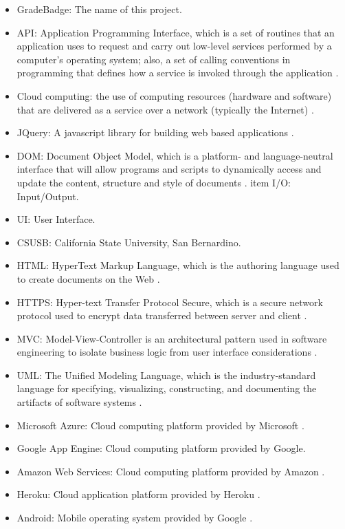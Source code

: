 \begin{itemize}
\item GradeBadge: The name of this project.
\item API: Application Programming Interface, which is a set of routines that an application uses to request and carry out low-level services performed by a computer's operating system; also, a set of calling conventions in programming that defines how a service is invoked through the application \cite{API}.
\item Cloud computing: the use of computing resources (hardware and software) that are delivered as a service over a network (typically the Internet) \cite{cloudcomputing}.
\item JQuery: A javascript library for building web based applications \cite{JQuery}.
\item DOM: Document Object Model, which is a platform- and language-neutral interface that will allow programs and scripts to dynamically access and update the content, structure and style of documents \cite{DOM}.
item I/O: Input/Output.
\item UI: User Interface.
\item CSUSB: California State University, San Bernardino.
\item HTML: HyperText Markup Language, which is the authoring language used to create documents on the Web \cite{w3}.
\item HTTPS: Hyper-text Transfer Protocol Secure, which is a secure network protocol used to encrypt data transferred  between server and client \cite{https}.
\item MVC\label{def:mvc}: Model-View-Controller is an architectural pattern used in software engineering to isolate business logic from user interface considerations \cite{MVC}.
\item UML: The Unified Modeling Language, which is the industry-standard language for specifying, visualizing, constructing, and documenting the artifacts of software systems \cite{uml}.
\item Microsoft Azure: Cloud computing platform provided by Microsoft \cite{MicrosoftAzure}.
\item Google App Engine: Cloud computing platform provided by Google.
\item Amazon Web Services: Cloud computing platform provided by Amazon \cite{AWS}.
\item Heroku: Cloud application platform provided by Heroku \cite{Heroku}.
\item Android: Mobile operating system provided by Google \cite{Android}.

\end{itemize}

